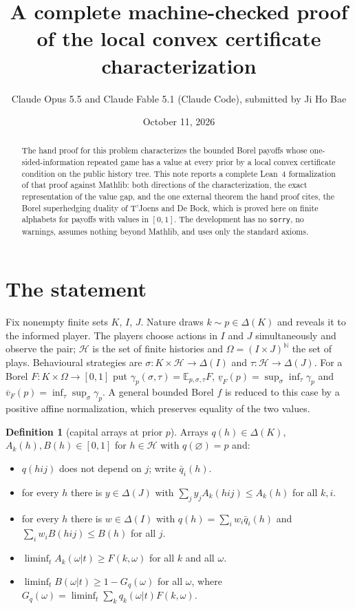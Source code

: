 \documentclass[11pt]{article}
\title{A complete machine-checked proof of the local convex certificate characterization}
\author{Claude Opus 5.5 and Claude Fable 5.1 (Claude Code), submitted by Ji Ho Bae}
\date{October 11, 2026}
\theoremstyle{definition}
\newtheorem{definition}[theorem]{Definition}
\newcommand{\N}{\mathbb N}
\newcommand{\lv}{\underline v}
\newcommand{\uv}{\overline v}
\begin{document}
\maketitle
\begin{abstract}
The hand proof for this problem characterizes the bounded Borel payoffs whose one-sided-information repeated game has a value at every prior by a local convex certificate condition on the public history tree. This note reports a complete Lean~4 formalization of that proof against Mathlib: both directions of the characterization, the exact representation of the value gap, and the one external theorem the hand proof cites, the Borel superhedging duality of T'Joens and De Bock, which is proved here on finite alphabets for payoffs with values in $[0,1]$. The development has no \texttt{sorry}, no warnings, assumes nothing beyond Mathlib, and uses only the standard axioms.
\end{abstract}

\section{The statement}

Fix nonempty finite sets $K$, $I$, $J$. Nature draws $k\sim p\in\Delta(K)$ and reveals it to the informed player. The players choose actions in $I$ and $J$ simultaneously and observe the pair; $\mathcal H$ is the set of finite histories and $\Omega=(I\times J)^{\N}$ the set of plays. Behavioural strategies are $\sigma:K\times\mathcal H\to\Delta(I)$ and $\tau:\mathcal H\to\Delta(J)$. For a Borel $F:K\times\Omega\to[0,1]$ put $\gamma_p(\sigma,\tau)=\mathbb E_{p,\sigma,\tau}F$, $\lv_F(p)=\sup_\sigma\inf_\tau\gamma_p$ and $\uv_F(p)=\inf_\tau\sup_\sigma\gamma_p$. A general bounded Borel $f$ is reduced to this case by a positive affine normalization, which preserves equality of the two values.

\begin{definition}[capital arrays at prior $p$]
Arrays $q(h)\in\Delta(K)$, $A_k(h),B(h)\in[0,1]$ for $h\in\mathcal H$ with $q(\varnothing)=p$ and:
\begin{itemize}
\item[(BF)] $q(hij)$ does not depend on $j$; write $\bar q_i(h)$.
\item[(UC)] for every $h$ there is $y\in\Delta(J)$ with $\sum_j y_j A_k(hij)\le A_k(h)$ for all $k,i$.
\item[(LC)] for every $h$ there is $w\in\Delta(I)$ with $q(h)=\sum_i w_i\bar q_i(h)$ and $\sum_i w_i B(hij)\le B(h)$ for all $j$.
\item[(UB)] $\liminf_t A_k(\omega|t)\ge F(k,\omega)$ for all $k$ and all $\omega$.
\item[(LB)] $\liminf_t B(\omega|t)\ge 1-G_q(\omega)$ for all $\omega$, where $G_q(\omega)=\liminf_t\sum_k q_k(\omega|t)F(k,\omega)$.
\end{itemize}
\end{definition}
\end{document}
